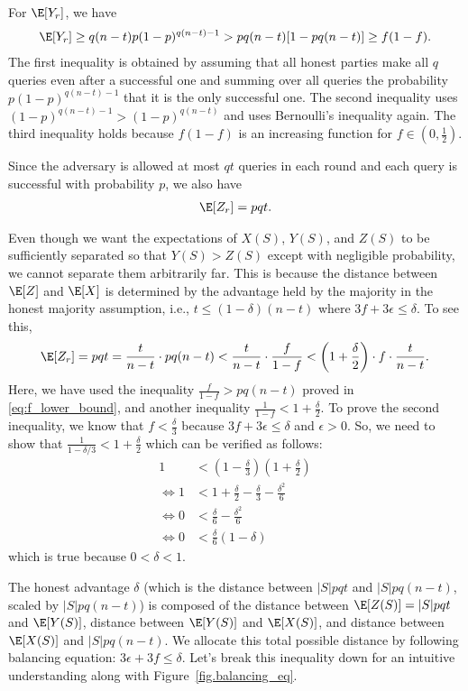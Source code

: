 For $\E[Y_r]$, we have
\begin{align}
\label{eq:y_lower_bound}
    \E[Y_r]  \geq q(n-t)p (1-p)^{q(n-t)-1} > pq(n-t)[1-pq(n-t)] \geq f (1-f).
\end{align}
The first inequality is obtained by assuming that all honest parties make all $q$ queries even after a successful one and summing over all queries the probability $p(1-p)^{q(n-t)-1}$ that it is the only successful one.
The second inequality uses $(1-p)^{q(n-t)-1} > (1-p)^{q(n-t)}$ and uses Bernoulli's inequality again.
The third inequality holds because $f(1-f)$ is an increasing function for $f \in (0,\frac12)$.

Since the adversary is allowed at most $qt$ queries in each round and each query is successful with probability $p$, we also have
\begin{align}
    \E[Z_r] = pqt.
\end{align}

Even though we want the expectations of $X(S)$, $Y(S)$, and $Z(S)$ to be sufficiently separated so that $Y(S) > Z(S)$ except with negligible probability, we cannot separate them arbitrarily far. This is because the distance between $\E[Z]$ and $\E[X]$ is determined by the advantage held by the majority in the honest majority assumption, i.e., $t \leq (1-\delta)(n-t)$ where $3f+3\epsilon \leq \delta$.
To see this,
\begin{align}
    \E[Z_r] = pqt = \frac{t}{n-t} \cdot pq(n-t) < \frac{t}{n-t} \cdot \frac{f}{1-f} < \left(1+\frac{\delta}{2}\right)\cdot f \cdot \frac{t}{n-t}.
\end{align}
Here, we have used the inequality $\frac{f}{1-f} > pq(n-t)$ proved in \eqref{eq:f_lower_bound}, and another inequality $\frac{1}{1-f} < 1 + \frac{\delta}{2}$. To prove the second inequality, we know that $f < \frac{\delta}{3}$ because $3f+3\epsilon \leq \delta$ and $\epsilon>0$. So, we need to show that $\frac{1}{1-\delta/3} < 1+\frac{\delta}{2}$ which can be verified as follows:
\begin{align*}
    1 &< \left(1-\frac{\delta}{3}\right) \left(1+\frac{\delta}{2}\right) \\
    \iff 1 &< 1 + \frac{\delta}{2} - \frac{\delta}{3} - \frac{\delta^2}{6} \\
    \iff 0 &< \frac{\delta}{6} - \frac{\delta^2}{6} \\
    \iff 0 &< \frac{\delta}{6}(1-\delta)
\end{align*}
which is true because $0 < \delta < 1$.

The honest advantage $\delta$ (which is the distance between $|S|pqt$ and $|S|pq(n-t)$, scaled by $|S|pq(n-t)$) is composed of the distance between $\E[Z(S)]=|S|pqt$ and $\E[Y(S)]$, distance between $\E[Y(S)]$ and $\E[X(S)]$, and distance between $\E[X(S)]$ and $|S|pq(n-t)$. We allocate this total possible distance by following balancing equation: $3\epsilon + 3f \leq \delta$. Let's break this inequality down for an intuitive understanding along with Figure~\ref{fig.balancing_eq}.

